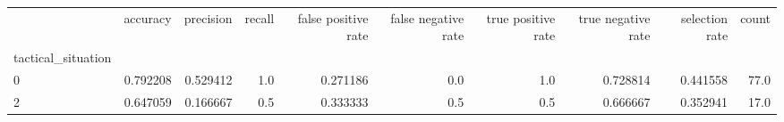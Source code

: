 \begin{tabular}{lrrrrrrrrr}
\toprule
{} &  accuracy &  precision &  recall &  false positive rate &  false negative rate &  true positive rate &  true negative rate &  selection rate &  count \\
tactical\_situation &           &            &         &                      &                      &                     &                     &                 &        \\
\midrule
0                  &  0.792208 &   0.529412 &     1.0 &             0.271186 &                  0.0 &                 1.0 &            0.728814 &        0.441558 &   77.0 \\
2                  &  0.647059 &   0.166667 &     0.5 &             0.333333 &                  0.5 &                 0.5 &            0.666667 &        0.352941 &   17.0 \\
\bottomrule
\end{tabular}
